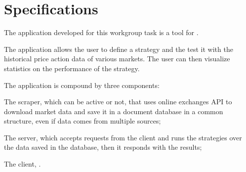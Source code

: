 \chapter{Specifications}

The application developed for this workgroup task is a tool for
.

The application allows the user to define a strategy and the test it with the
historical price action data of various markets. The user can then visualize
statistics on the performance of the strategy.

The application is compound by three components:
\begin{enumerate*}[label=(\roman*)]
	\item The scraper, which can be active or not, that uses online
		exchanges API to download market data and save it in a document
		database in a common structure, even if data comes from multiple
		sources;
	\item The server, which accepts requests from the client and runs the
		strategies over the data saved in the database, then it responds
		with the results;
	\item The client, .
\end{enumerate*}

